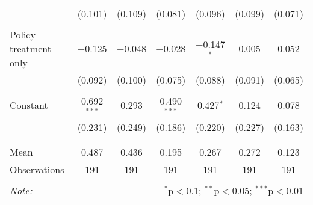 \begin{tabular}{@{\extracolsep{5pt}}lcccccc}
  & (0.101) & (0.109) & (0.081) & (0.096) & (0.099) & (0.071) \\ 
  & & & & & & \\ 
 Policy treatment only & $-$0.125 & $-$0.048 & $-$0.028 & $-$0.147$^{*}$ & 0.005 & 0.052 \\ 
  & (0.092) & (0.100) & (0.075) & (0.088) & (0.091) & (0.065) \\ 
  & & & & & & \\ 
 Constant & 0.692$^{***}$ & 0.293 & 0.490$^{***}$ & 0.427$^{*}$ & 0.124 & 0.078 \\ 
  & (0.231) & (0.249) & (0.186) & (0.220) & (0.227) & (0.163) \\ 
  & & & & & & \\ 
\hline \\[-1.8ex] 
Mean & 0.487 & 0.436 & 0.195 & 0.267 & 0.272 & 0.123 \\ 
Observations & 191 & 191 & 191 & 191 & 191 & 191 \\ 
\hline 
\hline \\[-1.8ex] 
\textit{Note:}  & \multicolumn{6}{r}{$^{*}$p$<$0.1; $^{**}$p$<$0.05; $^{***}$p$<$0.01} \\ 
\end{tabular} 
